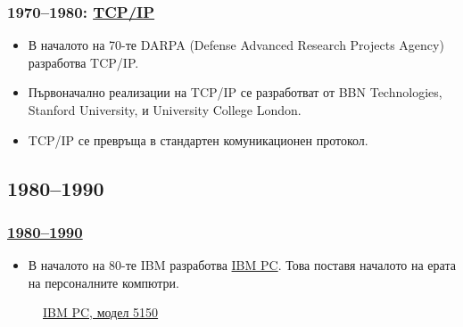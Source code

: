 \documentclass[ignorenonframetext, hyperref=unicode]{beamer}
\begin{document}
\begin{frame}
\frametitle{
1970--1980: \href{http://en.wikipedia.org/wiki/Tcp/ip}{TCP/IP}}
\begin{itemize}
  \item В началото на 70-те DARPA (Defense Advanced Research Projects Agency)
    разработва TCP/IP.
  \item Първоначално реализации на TCP/IP се разработват от BBN Technologies,
  Stanford University,  и University College London.
  \item TCP/IP се превръща в стандартен комуникационен протокол.
\end{itemize}
\end{frame}


\subsection{1980--1990}

\begin{frame}
\frametitle{\href{http://en.wikipedia.org/wiki/History_of_computing_hardware_(1960s-present)}{
1980--1990}}
\begin{itemize}
  \item В началото на 80-те IBM разработва
  \href{http://en.wikipedia.org/wiki/IBM_PC}{IBM PC}. Това поставя началото на 
  ерата на персоналните компютри. 
\end{itemize}
\begin{figure}
\center
{}
\caption{\href{http://en.wikipedia.org/wiki/IBM_PC}{IBM PC, модел 5150}} 
\end{figure}

\end{frame}
\end{document}
